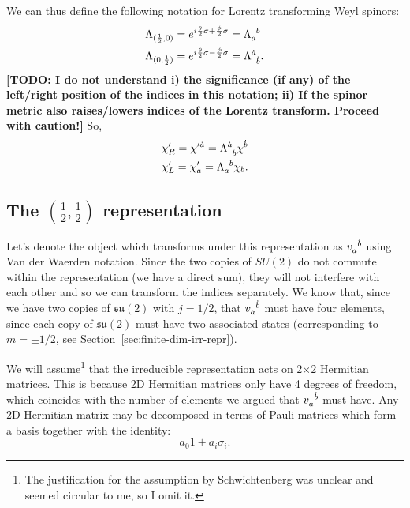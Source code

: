 \documentclass[11pt]{article}
\numberwithin{equation}{section}
\newcommand{\tn}[2]{\tensor{#1}{#2}}
\begin{document}
We can thus define the following notation for Lorentz transforming Weyl spinors:
\begin{align}
\Lambda_{(\frac{1}{2},0)} &=  e^{i \frac{\theta}{2}\sigma + \frac{\phi}{2} \sigma} = \tn{\Lambda}{_a^b}  \\
\Lambda_{(0, \frac{1}{2})} &=  e^{i \frac{\theta}{2}\sigma - \frac{\phi}{2} \sigma} = \tn{\Lambda}{^{\dot{a}}_{\dot{b}}}. \label{eq:weyl-spinor-lt}
\end{align}
\textbf{[TODO: I do not understand i) the significance (if any) of the left/right position of the indices in this notation; ii) If the spinor metric also raises/lowers indices of the Lorentz transform. Proceed with caution!]} So,
\begin{align}
\chi'_R = \chi'^{\dot{a}} = \tn{\Lambda}{^{\dot{a}}_{\dot{b}}} \chi^{\dot{b}} \\
\chi'_L = \chi'_{a} = \tn{\Lambda}{_a^b} \chi_b. \\
\end{align}

\subsection{The $(\frac{1}{2},\frac{1}{2})$ representation}
Let's denote the object which transforms under this representation as $\tn{v}{_a^{\dot{b}}}$ using Van der Waerden notation. Since the two copies of $SU(2)$ do not commute within the representation (we have a direct sum), they will not interfere with each other and so we can transform the indices separately. We know that, since we have two copies of $\mathfrak{su}(2)$ with $j=1/2$, that $\tn{v}{_a^{\dot{b}}}$ must have four elements, since each copy of $\mathfrak{su}(2)$ must have two associated states (corresponding to $m=\pm 1/2$, see Section~\ref{sec:finite-dim-irr-repr}).

We will assume\footnote{The justification for the assumption by Schwichtenberg was unclear and seemed circular to me, so I omit it.} that the irreducible representation acts on 2$\times$2 Hermitian matrices. This is because 2D Hermitian matrices only have 4 degrees of freedom, which coincides with the number of elements we argued that $\tn{v}{_a^{\dot{b}}}$ must have. Any 2D Hermitian matrix may be decomposed in terms of Pauli matrices which form a basis together with the identity:
\begin{equation}
a_0 1 + a_i \sigma_i.
\end{equation}
\end{document}
